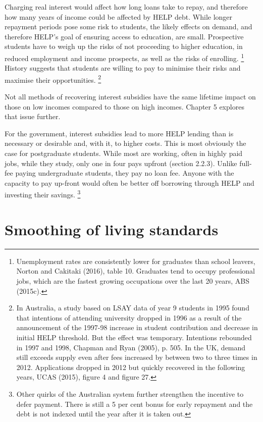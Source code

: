 \documentclass[embargoed]{grattan}
\begin{document}
Charging real interest would affect how long loans take to repay, and therefore how many years of income could be affected by \gls{HELP} debt.
While longer repayment periods pose some risk to students, the likely effects on demand, and therefore \gls{HELP}'s goal of ensuring access to education, are small.
Prospective students have to weigh up the risks of not proceeding to higher education, in reduced employment and income prospects, as well as the risks of enrolling.%
\footnote{Unemployment rates are consistently lower for graduates than school leavers, Norton and Cakitaki (2016), table 10.
Graduates tend to occupy professional jobs, which are the fastest growing occupations over the last 20 years, ABS (2015c).} History suggests that students are willing to pay to minimise their risks and maximise their opportunities.%
\footnote{In Australia, a study based on LSAY data of year 9 students in 1995 found that intentions of attending university dropped in 1996 as a result of the announcement of the 1997-98 increase in student contribution and decrease in initial \gls{HELP} threshold.
But the effect was temporary.
Intentions rebounded in 1997 and 1998, Chapman and Ryan (2005), p. 505.
In the UK, demand still exceeds supply even after fees increased by between two to three times in 2012.
Applications dropped in 2012 but quickly recovered in the following years, UCAS (2015), figure 4 and figure 27.}

Not all methods of recovering interest subsidies have the same lifetime impact on those on low incomes compared to those on high incomes.
Chapter 5 explores that issue further.

For the government, interest subsidies lead to more \gls{HELP} lending than is necessary or desirable and, with it, to higher costs.
This is most obviously the case for postgraduate students.
While most are working, often in highly paid jobs, while they study, only one in four pays upfront (section 2.2.3).
Unlike full-fee paying undergraduate students, they pay no loan fee.
Anyone with the capacity to pay up-front would often be better off borrowing through \gls{HELP} and investing their savings.%
\footnote{Other quirks of the Australian system further strengthen the incentive to defer payment.
There is still a 5 per cent bonus for early repayment and the debt is not indexed until the year after it is taken out.}

\section{Smoothing of living standards}\label{smoothing-of-living-standards}
\end{document}
